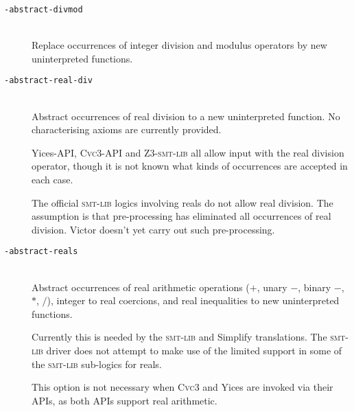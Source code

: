 \documentclass[12pt,fleqn]{article}
\newcommand{\cvcthree}{\textsc{Cvc}3}
\newcommand{\zthree}{\textsc{Z}3}
\newcommand{\yices}{Yices}
\newcommand{\smtlib}{\textsc{smt-lib}}
\newcommand{\optionb}[1]{\item[\texttt{-{#1}}]\ \\}
\begin{document}
\begin{description}
\optionb{abstract-divmod}
  Replace occurrences of integer division and modulus operators by new 
  uninterpreted functions.  


\optionb{abstract-real-div}
  Abstract occurrences of real division to a new uninterpreted function.
  No characterising axioms are currently provided.

  \yices-API, \cvcthree-API and \zthree-\smtlib{} all allow input 
  with the real division operator, though it is not known what kinds of
  occurrences are accepted in each case.

  The official \smtlib{} logics involving reals do not allow real division.
  The assumption is that pre-processing has eliminated all occurrences of
  real division.  Victor doesn't yet carry out such pre-processing.

\optionb{abstract-reals}
  Abstract occurrences of real arithmetic operations 
  ($+$, unary $-$, binary $-$, $*$, $/$), integer to real coercions, and
  real inequalities to new uninterpreted functions.

  Currently this is needed by the \smtlib{} and Simplify translations.
  The \smtlib{} driver does not attempt to make use of the limited
  support in some of the \smtlib{} sub-logics for reals.

  This option is not necessary when \cvcthree{} and \yices{} are
  invoked via their APIs, as both APIs support real arithmetic.

\end{description}
\end{document}
